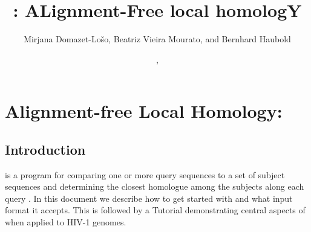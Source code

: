\documentclass{report}
\begin{document}
\title{: ALignment-Free local homologY}
\author{Mirjana Domazet-Lo\v{s}o, Beatriz Vieira Mourato, and Bernhard Haubold}
\date{\!\!, }
\maketitle

\tableofcontents
\chapter{Alignment-free Local Homology: }
\section{Introduction}
 is a program for comparing one or more query sequences to a
set of subject sequences and determining the closest homologue among
the subjects along each query \cite{dom11:ali}. In this document we
describe how to get started with  and what input format it
accepts. This is followed by a Tutorial demonstrating central aspects
of  when applied to HIV-1 genomes.
\end{document}
